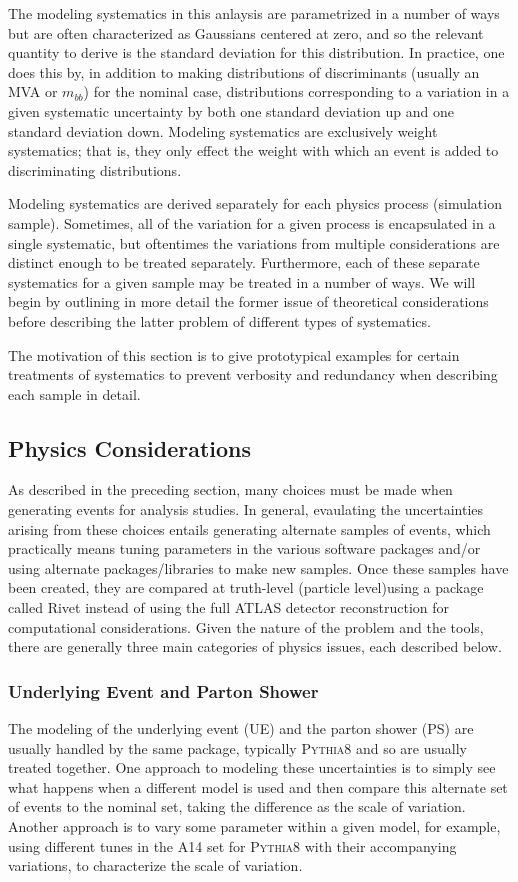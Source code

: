   The modeling systematics in this anlaysis are parametrized in a number of ways but are often characterized as Gaussians centered at zero, and so the relevant quantity to derive is the standard deviation for this distribution.  In practice, one does this by, in addition to making distributions of discriminants (usually an MVA or $m_{bb}$) for the nominal case, distributions corresponding to a variation in a given systematic uncertainty by both one standard deviation up and one standard deviation down.  Modeling systematics are exclusively weight systematics; that is, they only effect the weight with which an event is added to discriminating distributions.

Modeling systematics are derived separately for each physics process (simulation sample).  Sometimes, all of the variation for a given process is encapsulated in a single systematic, but oftentimes the variations from multiple considerations are distinct enough to be treated separately.  Furthermore, each of these separate systematics for a given sample may be treated in a number of ways.  We will begin by outlining in more detail the former issue of theoretical considerations before describing the latter problem of different types of systematics.

The motivation of this section is to give prototypical examples for certain treatments of systematics to prevent verbosity and redundancy when describing each sample in detail.

\subsection{Physics Considerations}
As described in the preceding section, many choices must be made when generating events for analysis studies.  In general, evaulating the uncertainties arising from these choices entails generating alternate samples of events, which practically means tuning parameters in the various software packages and/or using alternate packages/libraries to make new samples.  Once these samples have been created, they are compared at truth-level (particle level)using a package called Rivet \cite{rivetmanual} instead of using the full ATLAS detector reconstruction for computational considerations.  Given the nature of the problem and the tools, there are generally three main categories of physics issues, each described below.

\subsubsection{Underlying Event and Parton Shower}
\label{sec:ueps}
The modeling of the underlying event (UE) and the parton shower (PS) are usually handled by the same package, typically \textsc{Pythia8} and so are usually treated together.  One approach to modeling these uncertainties is to simply see what happens when a different model is used and then compare this alternate set of events to the nominal set, taking the difference as the scale of variation.  Another approach is to vary some parameter within a given model, for example, using different tunes in the A14 set for \textsc{Pythia8} with their accompanying variations, to characterize the scale of variation.  

